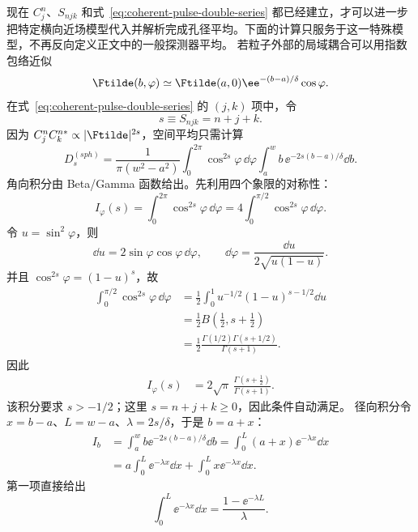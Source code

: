 现在 $C_j^n$、$S_{njk}$ 和式~\eqref{eq:coherent-pulse-double-series} 都已经建立，才可以进一步把特定横向近场模型代入并解析完成孔径平均。下面的计算只服务于这一特殊模型，不再反向定义正文中的一般探测器平均。
若粒子外部的局域耦合可以用指数包络近似
\begin{equation}
\Ftilde(b,\varphi)
\simeq \Ftilde(a,0)
\ee^{-(b-a)/\delta}\cos\varphi.
\label{eq:F_spatial_model}
\end{equation}
在式~\eqref{eq:coherent-pulse-double-series} 的 \((j,k)\) 项中，令
\begin{equation}
s\equiv S_{njk}=n+j+k.
\end{equation}
因为
\(
C_j^nC_k^{n*}\propto|\Ftilde|^{2s}
\)，空间平均只需计算
\begin{equation}
D_s^{(sph)}
=\frac{1}{\pi(w^2-a^2)}
\int_0^{2\pi}\cos^{2s}\varphi\,\dd\varphi
\int_a^w b\,
\ee^{-2s(b-a)/\delta}\dd b.
\label{eq:Dfactor_start}
\end{equation}
角向积分由 Beta/Gamma 函数给出。先利用四个象限的对称性：
\begin{equation}
I_\varphi(s)=\int_0^{2\pi}\cos^{2s}\varphi\,\dd\varphi
=4\int_0^{\pi/2}\cos^{2s}\varphi\,\dd\varphi.
\end{equation}
令 $u=\sin^2\varphi$，则
\begin{equation}
\dd u=2\sin\varphi\cos\varphi\,\dd\varphi,
\qquad
\dd\varphi=\frac{\dd u}{2\sqrt{u(1-u)}}.
\end{equation}
并且 $\cos^{2s}\varphi=(1-u)^s$，故
\begin{align}
\int_0^{\pi/2}\cos^{2s}\varphi\,\dd\varphi
&=\frac12\int_0^1
u^{-1/2}(1-u)^{s-1/2}\dd u\\
&=\frac12 B\!\left(\frac12,s+\frac12\right)\\
&=\frac12\frac{\Gamma(1/2)\Gamma(s+1/2)}{\Gamma(s+1)}.
\end{align}
因此
\begin{align}
I_\varphi(s)
&=2\sqrt\pi\,
\frac{\Gamma(s+\frac12)}{\Gamma(s+1)}.
\label{eq:angularGamma}
\end{align}
该积分要求 $s>-1/2$；这里 $s=n+j+k\ge0$，因此条件自动满足。
径向积分令 \(x=b-a\)、\(L=w-a\)、\(\lambda=2s/\delta\)，于是 $b=a+x$：
\begin{align}
I_b
&=\int_a^w b\ee^{-2s(b-a)/\delta}\dd b
=\int_0^L(a+x)\ee^{-\lambda x}\dd x\\
&=a\int_0^L\ee^{-\lambda x}\dd x
+\int_0^Lx\ee^{-\lambda x}\dd x.
\end{align}
第一项直接给出
\begin{equation}
\int_0^L\ee^{-\lambda x}\dd x
=\frac{1-\ee^{-\lambda L}}{\lambda}.
\end{equation}
